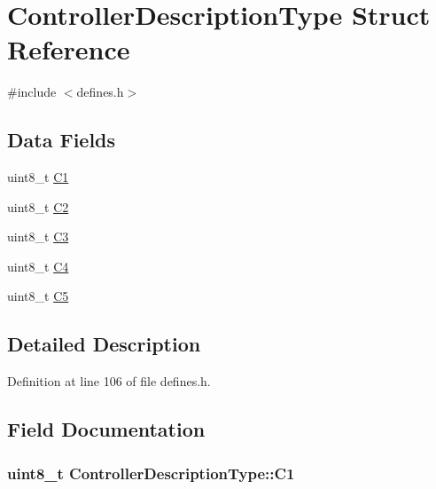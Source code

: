 \hypertarget{structControllerDescriptionType}{\section{Controller\-Description\-Type Struct Reference}
\label{structControllerDescriptionType}
}


{\ttfamily \#include $<$defines.\-h$>$}

\subsection*{Data Fields}
\begin{DoxyCompactItemize}
\item 
uint8\-\_\-t \hyperlink{structControllerDescriptionType_a042a33e692d7d242a384d8edc94af2f2}{C1}
\item 
uint8\-\_\-t \hyperlink{structControllerDescriptionType_ae2ac8a001bde9c68f92c6bb3a7287517}{C2}
\item 
uint8\-\_\-t \hyperlink{structControllerDescriptionType_ad24f2f797685ffd8f0bc96a800e5a6a8}{C3}
\item 
uint8\-\_\-t \hyperlink{structControllerDescriptionType_abc2badc5707de3327d15a00919fb7e08}{C4}
\item 
uint8\-\_\-t \hyperlink{structControllerDescriptionType_a5b520889371f53fb89e36a0de5f071e9}{C5}
\end{DoxyCompactItemize}


\subsection{Detailed Description}


Definition at line 106 of file defines.\-h.



\subsection{Field Documentation}
\hypertarget{structControllerDescriptionType_a042a33e692d7d242a384d8edc94af2f2}{
\subsubsection[{C1}]{\setlength{\rightskip}{0pt plus 5cm}uint8\-\_\-t Controller\-Description\-Type\-::\-C1}}\label{structControllerDescriptionType_a042a33e692d7d242a384d8edc94af2f2}


